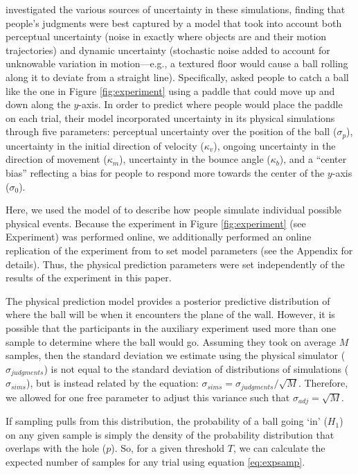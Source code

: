 \documentclass[10pt,letterpaper]{article}
\begin{document}
 investigated the various sources of uncertainty in these simulations, finding that people's judgments were best captured by a model that took into account both perceptual uncertainty (noise in exactly where objects are and their motion trajectories) and dynamic uncertainty (stochastic noise added to account for unknowable variation in motion---e.g., a textured floor would cause a ball rolling along it to deviate from a straight line).
Specifically,  asked people to catch a ball like the one in Figure \ref{fig:experiment} using a paddle that could move up and down along the $y$-axis.
In order to predict where people would place the paddle on each trial, their model incorporated uncertainty in its physical simulations through five parameters: perceptual uncertainty over the position of the ball ($\sigma_p$), uncertainty in the initial direction of velocity ($\kappa_v$), ongoing uncertainty in the direction of movement ($\kappa_m$), uncertainty in the bounce angle ($\kappa_b$), and a ``center bias'' reflecting a bias for people to respond more towards the center of the $y$-axis ($\sigma_0$).

Here, we used the model of  to describe how people simulate individual possible physical events.
Because the experiment in Figure \ref{fig:experiment} (see Experiment) was performed online, we additionally performed an online replication of the experiment from  to set model parameters (see the Appendix for details).
Thus, the physical prediction parameters were set independently of the results of the experiment in this paper.

The physical prediction model provides a posterior predictive distribution of where the ball will be when it encounters the plane of the wall.
However, it is possible that the participants in the auxiliary experiment used more than one sample to determine where the ball would go.
Assuming they took on average $M$ samples, then the standard deviation we estimate using the physical simulator ($\sigma_{judgments}$) is not equal to the standard deviation of distributions of simulations ($\sigma_{sims}$), but is instead related by the equation: $\sigma_{sims} = \sigma_{judgments} / \sqrt{M}$.
Therefore, we allowed for one free parameter to adjust this variance such that $\sigma_{adj}=\sqrt{M}$.

If sampling pulls from this distribution, the probability of a ball going `in' ($H_1$) on any given sample is simply the density of the probability distribution that overlaps with the hole ($p$).
So, for a given threshold $T$, we can calculate the expected number of samples for any trial using equation \ref{eq:expsamp}.
\end{document}
